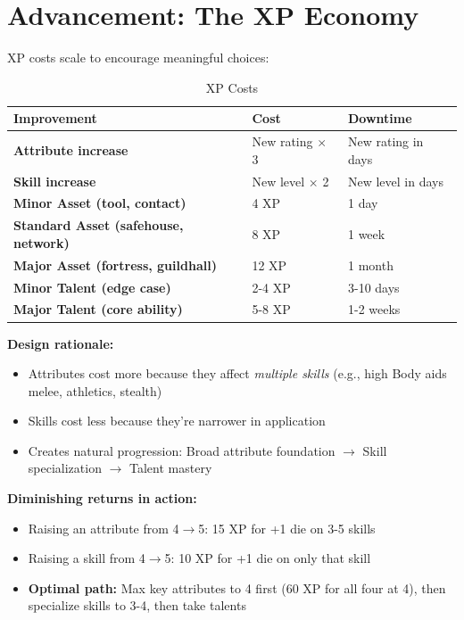 \documentclass[11pt]{article}
\begin{document}
\section{Advancement: The XP Economy}

XP costs scale to encourage meaningful choices:

\begin{table}[h]
\centering
\caption{XP Costs}
\begin{tabular}{>{\bfseries}l l l}
\toprule
Improvement & Cost & Downtime \\
\midrule
Attribute increase & New rating $\times$ 3 & New rating in days \\
Skill increase & New level $\times$ 2 & New level in days \\
Minor Asset (tool, contact) & 4 XP & 1 day \\
Standard Asset (safehouse, network) & 8 XP & 1 week \\
Major Asset (fortress, guildhall) & 12 XP & 1 month \\
Minor Talent (edge case) & 2-4 XP & 3-10 days \\
Major Talent (core ability) & 5-8 XP & 1-2 weeks \\
\bottomrule
\end{tabular}
\end{table}

\textbf{Design rationale:}
\begin{itemize}
    \item Attributes cost more because they affect \textit{multiple skills} (e.g., high Body aids melee, athletics, stealth)
    \item Skills cost less because they're narrower in application
    \item Creates natural progression: Broad attribute foundation $\rightarrow$ Skill specialization $\rightarrow$ Talent mastery
\end{itemize}

\textbf{Diminishing returns in action:}
\begin{itemize}
    \item Raising an attribute from 4$\rightarrow$5: 15 XP for +1 die on 3-5 skills
    \item Raising a skill from 4$\rightarrow$5: 10 XP for +1 die on only that skill
    \item \textbf{Optimal path:} Max key attributes to 4 first (60 XP for all four at 4), then specialize skills to 3-4, then take talents
\end{itemize}
\end{document}
